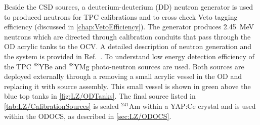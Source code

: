 Beside the CSD sources, a deuterium-deuterium (DD) neutron generator is used to produced neutrons for TPC calibrations and to cross check Veto tagging efficiency (discussed in \autoref{chap:VetoEfficiency}). The generator produces 2.45~MeV neutrons which are directed through calibration conduits that pass through the OD acrylic tanks to the OCV. A detailed description of neutron generation and the system is provided in Ref.~\cite{LZ:2024bsz}. To understand low energy detection efficiency of the TPC $^{88}\text{YBe}$ and $^{88}\text{YMg}$ photo-neutron sources are used. Both sources are deployed externally through a removing a small acrylic vessel in the OD and replacing it with source assembly. This small vessel is shown in green above the blue top tanks in  \autoref{fig:LZ/ODTanks}.
The final source listed in \autoref{tab:LZ/CalibrationSources} is sealed $^{241}\text{Am}$ within a YAP:Ce crystal and is used within the ODOCS, as described in \autoref{sec:LZ/ODOCS}.

